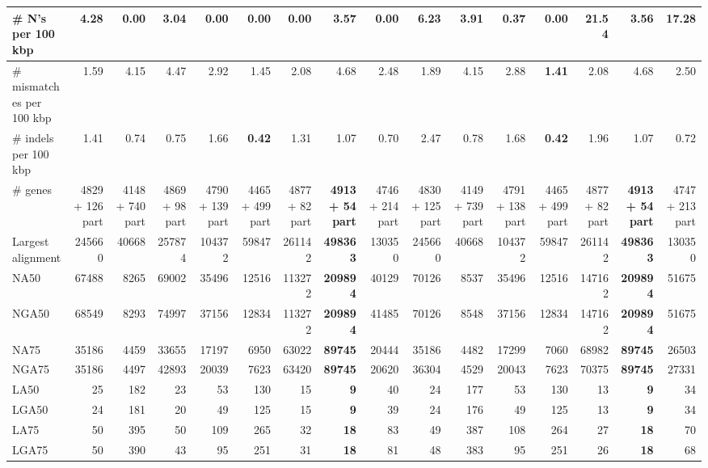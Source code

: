 \documentclass[12pt,a4paper]{article}
\begin{document}
\begin{table}[ht]
\begin{center}
\begin{tabular}{|l*{15}{|r}|}
\# N's per 100 kbp & 4.28 & {\bf 0.00} & 3.04 & {\bf 0.00} & {\bf 0.00} & {\bf 0.00} & 3.57 & {\bf 0.00} & 6.23 & 3.91 & 0.37 & {\bf 0.00} & 21.54 & 3.56 & 17.28 \\ \hline
\# mismatches per 100 kbp & 1.59 & 4.15 & 4.47 & 2.92 & 1.45 & 2.08 & 4.68 & 2.48 & 1.89 & 4.15 & 2.88 & {\bf 1.41} & 2.08 & 4.68 & 2.50 \\ \hline
\# indels per 100 kbp & 1.41 & 0.74 & 0.75 & 1.66 & {\bf 0.42} & 1.31 & 1.07 & 0.70 & 2.47 & 0.78 & 1.68 & {\bf 0.42} & 1.96 & 1.07 & 0.72 \\ \hline
\# genes & 4829 + 126 part & 4148 + 740 part & 4869 + 98 part & 4790 + 139 part & 4465 + 499 part & 4877 + 82 part & {\bf 4913 + 54 part} & 4746 + 214 part & 4830 + 125 part & 4149 + 739 part & 4791 + 138 part & 4465 + 499 part & 4877 + 82 part & {\bf 4913 + 54 part} & 4747 + 213 part \\ \hline
Largest alignment & 245660 & 40668 & 257874 & 104372 & 59847 & 261142 & {\bf 498363} & 130350 & 245660 & 40668 & 104372 & 59847 & 261142 & {\bf 498363} & 130350 \\ \hline
NA50 & 67488 & 8265 & 69002 & 35496 & 12516 & 113272 & {\bf 209894} & 40129 & 70126 & 8537 & 35496 & 12516 & 147162 & {\bf 209894} & 51675 \\ \hline
NGA50 & 68549 & 8293 & 74997 & 37156 & 12834 & 113272 & {\bf 209894} & 41485 & 70126 & 8548 & 37156 & 12834 & 147162 & {\bf 209894} & 51675 \\ \hline
NA75 & 35186 & 4459 & 33655 & 17197 & 6950 & 63022 & {\bf 89745} & 20444 & 35186 & 4482 & 17299 & 7060 & 68982 & {\bf 89745} & 26503 \\ \hline
NGA75 & 35186 & 4497 & 42893 & 20039 & 7623 & 63420 & {\bf 89745} & 20620 & 36304 & 4529 & 20043 & 7623 & 70375 & {\bf 89745} & 27331 \\ \hline
LA50 & 25 & 182 & 23 & 53 & 130 & 15 & {\bf 9} & 40 & 24 & 177 & 53 & 130 & 13 & {\bf 9} & 34 \\ \hline
LGA50 & 24 & 181 & 20 & 49 & 125 & 15 & {\bf 9} & 39 & 24 & 176 & 49 & 125 & 13 & {\bf 9} & 34 \\ \hline
LA75 & 50 & 395 & 50 & 109 & 265 & 32 & {\bf 18} & 83 & 49 & 387 & 108 & 264 & 27 & {\bf 18} & 70 \\ \hline
LGA75 & 50 & 390 & 43 & 95 & 251 & 31 & {\bf 18} & 81 & 48 & 383 & 95 & 251 & 26 & {\bf 18} & 68 \\ \hline
\end{tabular}
\end{center}
\end{table}
\end{document}
